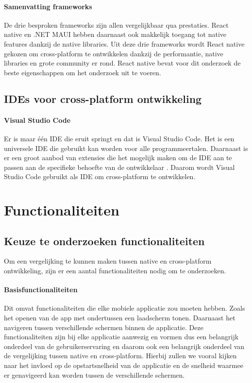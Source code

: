 \paragraph{Samenvatting frameworks}
De drie besproken frameworks zijn allen vergelijkbaar qua prestaties. React native en 
.NET MAUI hebben daarnaast ook makkelijk toegang tot native features dankzij de native libraries. 
Uit deze drie frameworks wordt React native gekozen om cross-platform te ontwikkelen 
dankzij de performantie, native libraries en grote community er rond. React native 
bevat voor dit onderzoek de beste eigenschappen om het onderzoek uit te voeren.

\subsection{IDEs voor cross-platform ontwikkeling}
\paragraph{Visual Studio Code}
Er is maar één IDE die eruit springt en dat is Visual Studio Code. Het is een 
universele IDE die gebruikt kan worden voor alle programmeertalen. Daarnaast is er een 
groot aanbod van extensies die het mogelijk maken om de IDE aan te passen aan de 
specifieke behoefte van de ontwikkelaar \autocite{Heller2022}. Daarom wordt Visual 
Studio Code gebruikt als IDE om cross-platform te ontwikkelen.

\section{Functionaliteiten}
\subsection{Keuze te onderzoeken functionaliteiten}
Om een vergelijking te kunnen maken tussen native en cross-platform ontwikkeling, 
zijn er een aantal functionaliteiten nodig om te onderzoeken. 

\paragraph{Basisfunctionaliteiten}
Dit omvat functionaliteiten die elke mobiele applicatie zou moeten hebben. Zoals 
het openen van de app met ondertussen een laadscherm tonen. Daarnaast het navigeren 
tussen verschillende schermen binnen de applicatie. Deze functionaliteiten zijn bij 
elke applicatie aanwezig en vormen dus een belangrijk onderdeel van de gebruikerservaring 
en daarom ook een belangrijk onderdeel van de vergelijking tussen native en cross-platform.
Hierbij zullen we vooral kijken naar het invloed op de opstartsnelheid van de applicatie 
en de snelheid waarmee er genavigeerd kan worden tussen de verschillende schermen.

